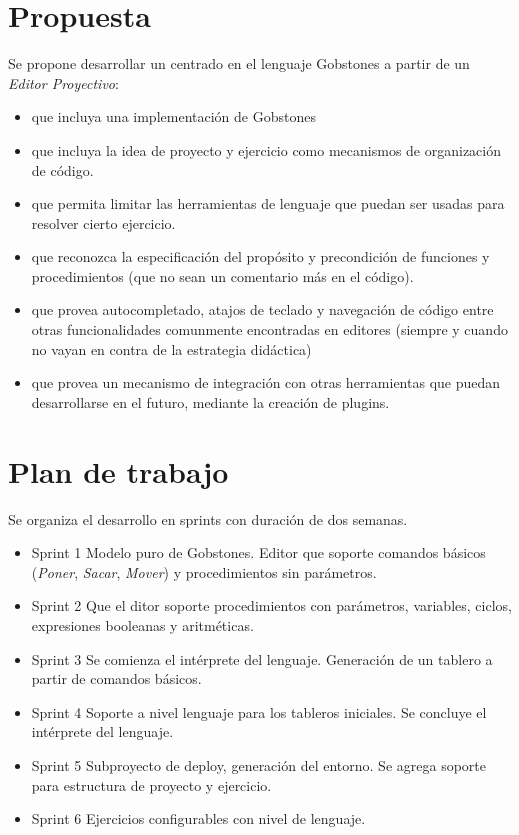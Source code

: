 \section{Propuesta}

Se propone desarrollar un \ile centrado en el lenguaje Gobstones a partir de un \textit{Editor Proyectivo}:

\begin{itemize}
  \item que incluya una implementación de Gobstones
  \item que incluya la idea de proyecto y ejercicio como mecanismos de organización de código.
  \item que permita limitar las herramientas de lenguaje que puedan ser usadas para resolver cierto ejercicio.
  \item que reconozca la especificación del propósito y precondición de funciones y procedimientos (que no sean un comentario más en el código).
  \item que provea autocompletado, atajos de teclado y navegación de código entre otras funcionalidades comunmente encontradas en editores (siempre y cuando no vayan en contra de la estrategia didáctica)
  \item que provea un mecanismo de integración con otras herramientas que puedan desarrollarse en el futuro, mediante la creación de plugins.
\end{itemize}


\section{Plan de trabajo}

Se organiza el desarrollo en sprints con duración de dos semanas.

\begin{itemize}
  \item{Sprint 1} Modelo puro de Gobstones. Editor que soporte comandos básicos (\textit{Poner}, \textit{Sacar}, \textit{Mover}) y procedimientos sin parámetros.
  \item{Sprint 2} Que el ditor soporte procedimientos con parámetros, variables, ciclos, expresiones booleanas y aritméticas.
  \item{Sprint 3} Se comienza el intérprete del lenguaje. Generación de un tablero a partir de comandos básicos.
  \item{Sprint 4} Soporte a nivel lenguaje para los tableros iniciales. Se concluye el intérprete del lenguaje. 
  \item{Sprint 5} Subproyecto de deploy, generación del entorno. Se agrega soporte para estructura de proyecto y ejercicio.
  \item{Sprint 6} Ejercicios configurables con nivel de lenguaje.
\end{itemize} 

